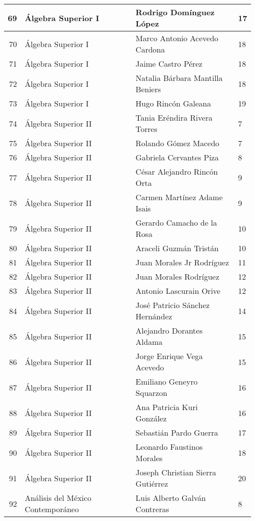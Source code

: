 \begin{table}[ht]
\begin{tabular}{rlll}
  69 & Álgebra Superior I & Rodrigo Domínguez López & 17 \\ \hline
  70 & Álgebra Superior I & Marco Antonio Acevedo Cardona & 18 \\ \hline
  71 & Álgebra Superior I & Jaime Castro Pérez & 18 \\ \hline
  72 & Álgebra Superior I & Natalia Bárbara Mantilla Beniers & 18 \\ \hline
  73 & Álgebra Superior I & Hugo Rincón Galeana & 19 \\ \hline
  74 & Álgebra Superior II & Tania Eréndira Rivera Torres & 7 \\ \hline
  75 & Álgebra Superior II & Rolando Gómez Macedo & 7 \\ \hline
  76 & Álgebra Superior II & Gabriela Cervantes Piza & 8 \\ \hline
  77 & Álgebra Superior II & César Alejandro Rincón Orta & 9 \\ \hline
  78 & Álgebra Superior II & Carmen Martínez Adame Isais & 9 \\ \hline
  79 & Álgebra Superior II & Gerardo Camacho de la Rosa & 10 \\ \hline
  80 & Álgebra Superior II & Araceli Guzmán Tristán & 10 \\ \hline
  81 & Álgebra Superior II & Juan Morales Jr Rodríguez & 11 \\ \hline
  82 & Álgebra Superior II & Juan Morales Rodríguez & 12 \\ \hline
  83 & Álgebra Superior II & Antonio Lascurain Orive & 12 \\ \hline
  84 & Álgebra Superior II & José Patricio Sánchez Hernández & 14 \\ \hline
  85 & Álgebra Superior II & Alejandro Dorantes Aldama & 15 \\ \hline
  86 & Álgebra Superior II & Jorge Enrique Vega Acevedo & 15 \\ \hline
  87 & Álgebra Superior II & Emiliano Geneyro Squarzon & 16 \\ \hline
  88 & Álgebra Superior II & Ana Patricia Kuri González & 16 \\ \hline
  89 & Álgebra Superior II & Sebastián Pardo Guerra & 17 \\ \hline
  90 & Álgebra Superior II & Leonardo Faustinos Morales & 18 \\ \hline
  91 & Álgebra Superior II & Joseph Christian Sierra Gutiérrez & 20 \\ \hline
  92 & Análisis del México Contemporáneo & Luis Alberto Galván Contreras & 8 \\ \hline

\end{tabular}
\end{table}

